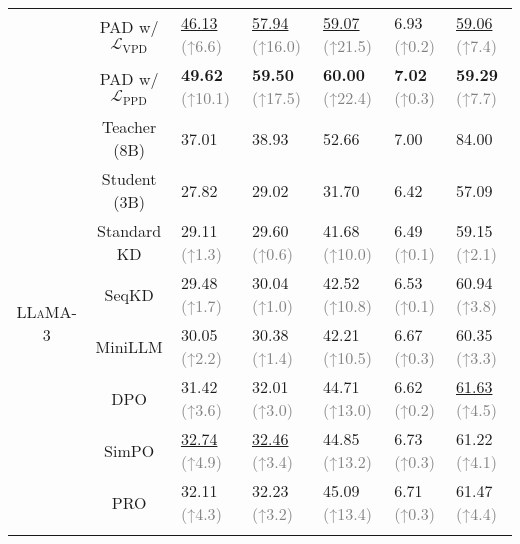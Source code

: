 \begin{table*}[htbp]
\begin{tabular*}{\textwidth}{cc ll lll}
& PAD w/ $\mathcal{L}_\text{VPD}$ & \underline{46.13} \textcolor{gray}{\scriptsize{(↑6.6})} & \underline{57.94} \textcolor{gray}{\scriptsize{(↑16.0})} & \underline{59.07} \textcolor{gray}{\scriptsize{(↑21.5})} & 6.93 \textcolor{gray}{\scriptsize{(↑0.2})} & \underline{59.06} \textcolor{gray}{\scriptsize{(↑7.4})} \\
& PAD w/ $\mathcal{L}_\text{PPD}$  & \textbf{49.62} \textcolor{gray}{\scriptsize{(↑10.1})} & \textbf{59.50} \textcolor{gray}{\scriptsize{(↑17.5})} & \textbf{60.00} \textcolor{gray}{\scriptsize{(↑22.4})} & \textbf{7.02} \textcolor{gray}{\scriptsize{(↑0.3})} & \textbf{59.29} \textcolor{gray}{\scriptsize{(↑7.7})} \\\hline\hline
\multirow{12}{*}{\textsc{LLaMA-3}} & Teacher (8B) & 37.01 & 38.93 & 52.66 & 7.00 & 84.00 \\
& Student (3B) & 27.82 & 29.02 & 31.70 & 6.42 & 57.09 \\\cline{2-7} 
& Standard KD & 29.11 \textcolor{gray}{\scriptsize{(↑1.3})} & 29.60 \textcolor{gray}{\scriptsize{(↑0.6})} & 41.68 \textcolor{gray}{\scriptsize{(↑10.0})} & 6.49 \textcolor{gray}{\scriptsize{(↑0.1})} & 59.15 \textcolor{gray}{\scriptsize{(↑2.1})} \\
& SeqKD & 29.48 \textcolor{gray}{\scriptsize{(↑1.7})} & 30.04 \textcolor{gray}{\scriptsize{(↑1.0})} & 42.52 \textcolor{gray}{\scriptsize{(↑10.8})} & 6.53 \textcolor{gray}{\scriptsize{(↑0.1})} & 60.94 \textcolor{gray}{\scriptsize{(↑3.8})} \\
& MiniLLM & 30.05 \textcolor{gray}{\scriptsize{(↑2.2})} & 30.38 \textcolor{gray}{\scriptsize{(↑1.4})} & 42.21 \textcolor{gray}{\scriptsize{(↑10.5})} & 6.67 \textcolor{gray}{\scriptsize{(↑0.3})} & 60.35 \textcolor{gray}{\scriptsize{(↑3.3})} \\\cline{2-7}
& DPO & 31.42 \textcolor{gray}{\scriptsize{(↑3.6})} & 32.01 \textcolor{gray}{\scriptsize{(↑3.0})} & 44.71 \textcolor{gray}{\scriptsize{(↑13.0})} & 6.62 \textcolor{gray}{\scriptsize{(↑0.2})} & \underline{61.63} \textcolor{gray}{\scriptsize{(↑4.5})} \\
& SimPO & \underline{32.74} \textcolor{gray}{\scriptsize{(↑4.9})} & \underline{32.46} \textcolor{gray}{\scriptsize{(↑3.4})} & 44.85 \textcolor{gray}{\scriptsize{(↑13.2})} & 6.73 \textcolor{gray}{\scriptsize{(↑0.3})} & 61.22 \textcolor{gray}{\scriptsize{(↑4.1})} \\
& PRO & 32.11 \textcolor{gray}{\scriptsize{(↑4.3})} & 32.23 \textcolor{gray}{\scriptsize{(↑3.2})} & 45.09 \textcolor{gray}{\scriptsize{(↑13.4})} & 6.71 \textcolor{gray}{\scriptsize{(↑0.3})} & 61.47 \textcolor{gray}{\scriptsize{(↑4.4})} \\\cline{2-7}

\end{tabular*}
\end{table*}
